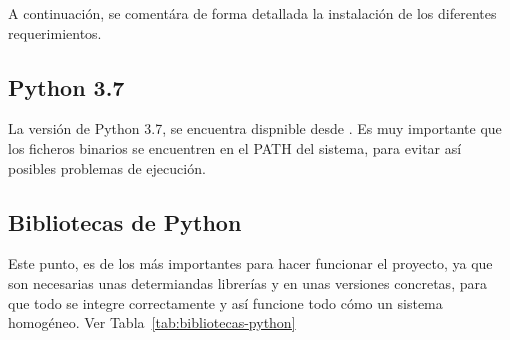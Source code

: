 A continuación, se comentára de forma detallada la instalación de los diferentes requerimientos.

\subsection{Python 3.7}
La versión de Python 3.7, se encuentra dispnible desde \cite{pythonDownload}. Es muy importante que los ficheros binarios se encuentren en el PATH del sistema, para evitar así posibles problemas de ejecución.

\subsection{Bibliotecas de Python}
Este punto, es de los más importantes para hacer funcionar el proyecto, ya que son necesarias unas determiandas librerías y en unas versiones concretas, para que todo se integre correctamente y así funcione todo
cómo un sistema homogéneo. Ver Tabla~\ref{tab:bibliotecas-python}

